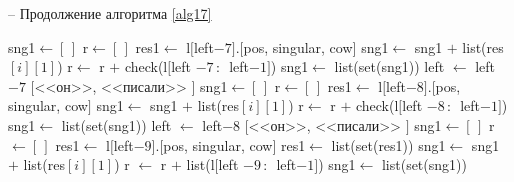 \documentclass[main]{subfiles}
\begin{document}
\begin{algorithm}
	\caption{-- Продолжение алгоритма \ref{alg17}}\label{alg18}
	\begin{algorithmic}[1]
		\State sng1$\gets [\, ]$
		\State r$\gets [\, ]$
		\State res1$\gets$ l$[$left$-7]$.$[$pos, singular, cow$]$
		\State sng1$\gets$ sng1 $+$ list(res$[i][1]$)
		\State r$\gets$ r $+$ check(l$[$left $-7\, :\, $ left$-1 ]$)
		\EndIf
		\EndFor
		\State sng1$\gets$ list(set(sng1))
		\State left $\gets$ left$-7$
		\Else
		\State \Return $[$<<он>>, <<писали>> $]$
		\EndIf
		\State sng1$\gets [\, ]$
		\State r$\gets [\, ]$
		\State res1$\gets$ l$[$left$-8]$.$[$pos, singular, cow$]$
		\State sng1$\gets$ sng1 $+$ list(res$[i][1]$)
		\State r$\gets$ r $+$ check(l$[$left $-8\, :\, $ left$-1 ]$)
		\EndIf
		\EndFor
		\State sng1$\gets$ list(set(sng1))
		\State left $\gets$ left$-8$
		\Else
		\State \Return $[$<<он>>, <<писали>> $]$
		\EndIf
		\Else
		\State sng1$\gets [\,]$
		\State r $\gets [\, ]$ 
		\State res1$\gets$ l$[$left$-9]$.$[$pos, singular, cow$]$
		\State res1$\gets$ list(set(res1))
		\State sng1$\gets$ sng1 $+$ list(res$[i][1]$)
		\State r $\gets$ r $+$ list(l$[$left $-9\, :\, $ left$-1 ]$)
		\EndIf
		\EndFor	
		\State sng1$\gets$ list(set(sng1))
	\end{algorithmic}
\end{algorithm}
\end{document}
